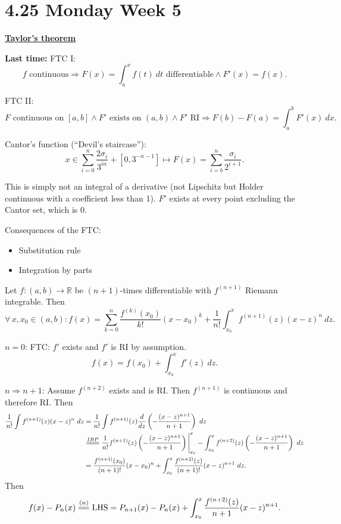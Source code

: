 \documentclass{notes}
\begin{document}
\newpage

\section{4.25 Monday Week 5}

{\boldmath \bfseries \underline{Taylor's theorem}}

{\boldmath \bfseries Last time:} FTC I: 
\[
  \text{$f$ continuous} \Rightarrow F(x) = \int_a^x f(t)\ dt \text{ differentiable} \land F'(x) = f(x).
\]

FTC II: 
\[
  \text{$F$ continuous on $[a, b]$} \land \text{$F'$ exists on $(a, b)$} \land \text{$F'$ RI} \Rightarrow F(b) - F(a) = \int_a^b  F'(x)\ dx.
\]

Cantor's function (``Devil's staircase''): 
\[
  x \in \sum_{i = 0}^n \frac{2 \sigma_i}{3^{i n}} + [0, 3^{-n - 1}] \mapsto F(x) = \sum_{i = b}^n \frac{\sigma_i}{2^{i + 1}}.
\]

This is simply not an integral of a derivative (not Lipschitz but Holder continuous with a coefficient less than 1).
$F'$ exists at every point excluding the Cantor set, which is 0.

Consequences of the FTC: 
\begin{itemize}
  \item Substitution rule

  \item Integration by parts
\end{itemize}

\begin{thm}
  Let $f \colon (a, b) \to \mathbb R$ be $(n + 1)$-times differentiable with $f^{(n + 1)}$ Riemann integrable.
  Then 
  \[
    \forall \, x, x_0 \in (a, b) \colon f(x) = \sum_{k = 0}^n \frac{f^{(k)}(x_0)}{k!} (x - x_0)^k + \frac{1}{n!} \int_{x_0}^x f^{(n + 1)}(z) (x - z)^n\ dz.
  \]
\end{thm}

\begin{prf}
  $n = 0$: FTC: $f'$ exists and $f'$ is RI by assumption.
  \[
    f(x) = f(x_0) + \int_{x_0}^x f'(z)\ dz.
  \]
  
  $n \Rightarrow n + 1$: Assume $f^{(n + 2)}$ exists and is RI.
  Then $f^{(n + 1)}$ is continuous and therefore RI.
  Then 
  \begin{align*}
    \frac{1}{n!} \int f^{(n + 1)}(z) (x - z)^n\ dz &= \frac{1}{n!} \int f^{(n + 1)}(z) \frac{d}{dz} \left ( -\frac{(x - z)^{n + 1}}{n + 1} \right )\ dz \\ 
    &\overset{IBP}{=\joinrel=\joinrel=} \frac{1}{n!} f^{(n + 1)}(z) \left ( -\frac{(x - z)^{n + 1}}{n + 1} \right ) \Bigg |_{x_0}^x - \int_{x_0}^x f^{(n + 2)}(z) \left ( -\frac{(x - z)^{n + 1}}{n + 1} \right )\ dz \\ 
    &= \frac{f^{(n + 1)}(x_0)}{(n + 1)!} (x - x_0)^n + \int_{x_0}^x \frac{f^{(n + 2)}(z)}{(n + 1)!} (x - z)^{n + 1}\ dz.
  \end{align*}
  Then 
  \[
    f(x) - P_n(x) \overset{(n)}{=\joinrel=} \text{LHS} = P_{n + 1}(x) - P_n(x) + \int_{x_0}^x \frac{f^{(n + 2)}(z)}{n + 1} (x - z)^{n + 1}.
  \]
\end{prf}
\end{document}
